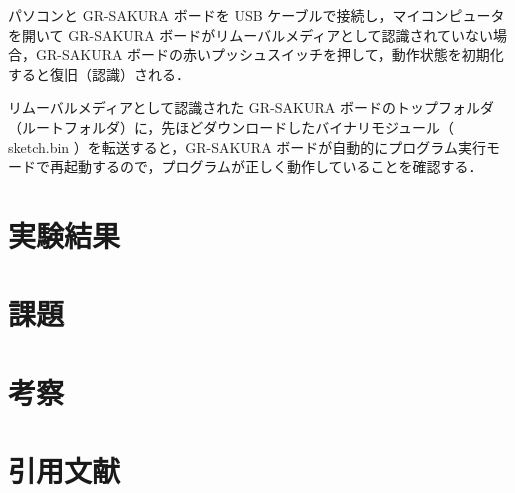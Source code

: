 \documentclass {ujarticle}
\begin{document}
 パソコンと GR-SAKURA ボードを USB ケーブルで接続し，マイコンピュータを開いて GR-SAKURA ボードがリムーバルメディアとして認識されていない場合，GR-SAKURA ボードの赤いプッシュスイッチを押して，動作状態を初期化すると復旧（認識）される．
 
 リムーバルメディアとして認識された GR-SAKURA ボードのトップフォルダ（ルートフォルダ）に，先ほどダウンロードしたバイナリモジュール（ sketch.bin ）を転送すると，GR-SAKURA ボードが自動的にプログラム実行モードで再起動するので，プログラムが正しく動作していることを確認する．
 \section{実験結果}
 
 \section{課題}
 
 \section{考察}
 
 \section{引用文献}
 
 
\end{document}
